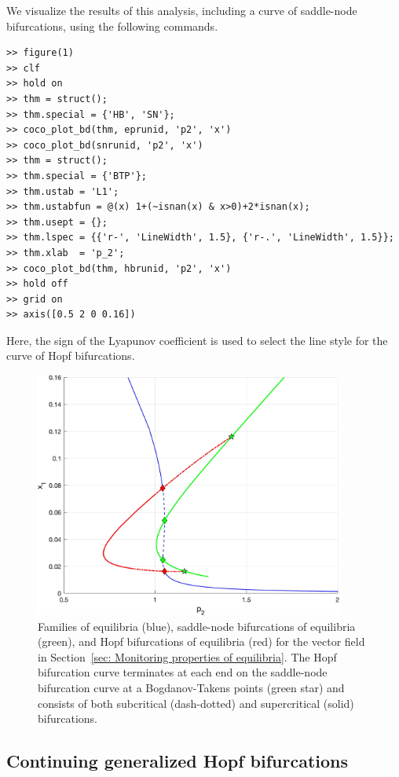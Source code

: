 We visualize the results of this analysis, including a curve of saddle-node bifurcations, using the following commands.
\begin{lstlisting}[language=coco-highlight,frame=lines]
>> figure(1)
>> clf
>> hold on
>> thm = struct();
>> thm.special = {'HB', 'SN'};
>> coco_plot_bd(thm, eprunid, 'p2', 'x')
>> coco_plot_bd(snrunid, 'p2', 'x')
>> thm = struct();
>> thm.special = {'BTP'};
>> thm.ustab = 'L1';
>> thm.ustabfun = @(x) 1+(~isnan(x) & x>0)+2*isnan(x);
>> thm.usept = {};
>> thm.lspec = {{'r-', 'LineWidth', 1.5}, {'r-.', 'LineWidth', 1.5}};
>> thm.xlab  = 'p_2';
>> coco_plot_bd(thm, hbrunid, 'p2', 'x')
>> hold off
>> grid on
>> axis([0.5 2 0 0.16])
\end{lstlisting}
Here, the sign of the Lyapunov coefficient is used to select the line style for the curve of Hopf bifurcations.
\begin{figure}[h]
\centering
\includegraphics[width=4in]{Figures/Section7_1_1.jpg}
\caption{Families of equilibria (blue), saddle-node bifurcations of equilibria (green), and Hopf bifurcations of equilibria (red) for the vector field in Section~\ref{sec: Monitoring properties of equilibria}. The Hopf bifurcation curve terminates at each end on the saddle-node bifurcation curve at a Bogdanov-Takens points (green star) and consists of both subcritical (dash-dotted) and supercritical (solid) bifurcations.}
\label{fig: Section7_1_1}
\end{figure}

\subsection{Continuing generalized Hopf bifurcations}
\label{sec: Continuing generalized Hopf bifurcations}

